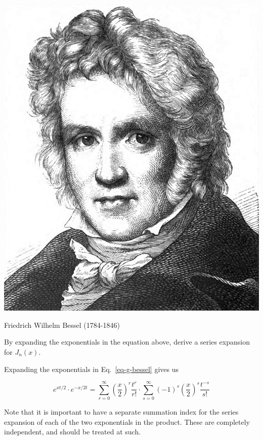 \begin{marginfigure}[-2cm]
  \includegraphics{bessel/figures/f_bessel}
  \caption{Friedrich Wilhelm Bessel (1784-1846)}
\end{marginfigure}

\begin{cue}
By expanding the exponentials in the equation above, derive a series expansion for $J_n(x)$.  
\end{cue}

Expanding the exponentials in Eq.~\ref{eq-g-bessel} gives us

\begin{equation}
e^{xt/2} \cdot e^{-x/2t} = \sum_{r = 0}^{\infty} {\left(\frac{x}{2}\right)}^r \frac{t^r}{r!} \cdot \sum_{s = 0}^{\infty} {(-1)}^s { \left(\frac{x}{2}\right)}^s \frac{t^{-s}}{s!}
\end{equation} 

Note that it is important to have a separate summation index for the series expansion of each of the two exponentials in the product. These are completely independent, and should be treated at such.


